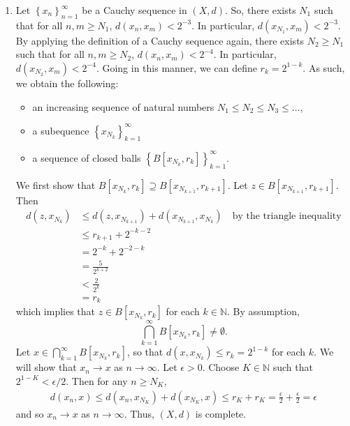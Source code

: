 \documentclass[11pt]{amsart}
\theoremstyle{plain}
\numberwithin{equation}{section}
\begin{document}
\begin{enumerate}[label=\textbf{(\alph*)}]
    \itemsep 0em
    \item Let $\left\{x_{n}\right\}_{n=1}^{\infty}$ be a Cauchy sequence in $(X,d)$. So, there exists $N_{1}$ such that for all $n,m\geq N_{1}$, $d\left(x_{n},x_{m}\right)<2^{-3}$. In particular, $d\left(x_{N_{1}},x_{m}\right)<2^{-3}$. By applying the definition of a Cauchy sequence again, there exists $N_{2}\geq N_{1}$ such that for all $n,m\geq N_{2}$, $d\left(x_{n},x_{m}\right)<2^{-4}$. In particular, $d\left(x_{N_{2}},x_{m}\right)<2^{-4}$. Going in this manner, we can define $r_{k}=2^{1-k}$. As such, we obtain the following:
\begin{itemize}
    \item an increasing sequence of natural numbers $N_{1}\leq N_{2}\leq N_{3}\leq\dots$,
    \item a subequence $\left\{x_{N_{k}}\right\}_{k=1}^{\infty}$
    \item a sequence of closed balls $\left\{B\left[x_{N_{k}},r_{k}\right]\right\}_{k=1}^{\infty}$.
\end{itemize}
We first show that $B\left[x_{N_{k}},r_{k}\right]\supseteq B\left[x_{N_{k+1}},r_{k+1}\right]$. Let $z\in B\left[x_{N_{k+1}},r_{k+1}\right]$. Then
\begin{align*}
    d\left(z,x_{N_{k}}\right)&\leq d\left(z,x_{N_{k+1}}\right)+d\left(x_{N_{k+1}},x_{N_{k}}\right)\quad\text{by the triangle inequality}
    \\
    &\leq r_{k+1}+2^{-k-2}
    \\
    &=2^{-k}+2^{-2-k}
    \\
    &=\frac{5}{2^{k+2}}
    \\
    &<\frac{2}{2^{k}}
    \\
    &=r_{k}
\end{align*}
which implies that $z\in B\left[x_{N_{k}},r_{k}\right]$ for each $k\in\mathbb{N}$. By assumption, \[\bigcap_{k=1}^{\infty}B\left[x_{N_{k}},r_{k}\right]\neq\emptyset.\] Let $x\in\bigcap_{k=1}^{\infty}B\left[x_{N_{k}},r_{k}\right]$, so that $d\left(x,x_{N_{k}}\right)\leq r_{k}=2^{1-k}$ for each $k$. We will show that $x_{n}\to x$ as $n\to\infty$. Let $\epsilon>0$. Choose $K\in\mathbb{N}$ such that $2^{1-K}<\epsilon/2$. Then for any $n\geq N_{K}$,
\begin{align*}
    d\left(x_{n},x\right)\leq d\left(x_{n},x_{N_{K}}\right)+d\left(x_{N_{K}},x\right)\leq r_{K}+r_{K}=\frac{\epsilon}{2}+\frac{\epsilon}{2}=\epsilon
\end{align*}
and so $x_{n}\to x$ as $n\to\infty$. Thus, $(X,d)$ is complete.

\end{enumerate}
\end{document}
